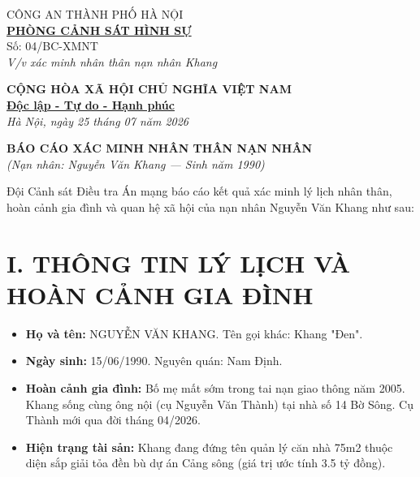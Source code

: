 \documentclass[12pt,a4paper]{article}
\begin{document}
\noindent
\begin{minipage}[t]{0.45\textwidth}
    \begin{center}
        \small
        CÔNG AN THÀNH PHỐ HÀ NỘI\\
        \textbf{\underline{PHÒNG CẢNH SÁT HÌNH SỰ}}\\[0.1cm]
        Số: 04/BC-XMNT\\
        \textit{V/v xác minh nhân thân nạn nhân Khang}
    \end{center}
\end{minipage}
\hfill
\begin{minipage}[t]{0.52\textwidth}
    \begin{center}
        \small
        \textbf{CỘNG HÒA XÃ HỘI CHỦ NGHĨA VIỆT NAM}\\
        \textbf{\underline{Độc lập - Tự do - Hạnh phúc}}\\[0.1cm]
        \textit{Hà Nội, ngày 25 tháng 07 năm 2026}
    \end{center}
\end{minipage}

\vspace{0.6cm}

\begin{center}
    \textbf{\large BÁO CÁO XÁC MINH NHÂN THÂN NẠN NHÂN}\\
    \textit{(Nạn nhân: Nguyễn Văn Khang — Sinh năm 1990)}
\end{center}

\vspace{0.3cm}

\noindent Đội Cảnh sát Điều tra Án mạng báo cáo kết quả xác minh lý lịch nhân thân, hoàn cảnh gia đình và quan hệ xã hội của nạn nhân Nguyễn Văn Khang như sau:

\section*{I. THÔNG TIN LÝ LỊCH VÀ HOÀN CẢNH GIA ĐÌNH}
\begin{itemize}[leftmargin=1.5cm]
    \item \textbf{Họ và tên:} NGUYỄN VĂN KHANG. Tên gọi khác: Khang "Đen".
    \item \textbf{Ngày sinh:} 15/06/1990. Nguyên quán: Nam Định.
    \item \textbf{Hoàn cảnh gia đình:} Bố mẹ mất sớm trong tai nạn giao thông năm 2005. Khang sống cùng ông nội (cụ Nguyễn Văn Thành) tại nhà số 14 Bờ Sông. Cụ Thành mới qua đời tháng 04/2026.
    \item \textbf{Hiện trạng tài sản:} Khang đang đứng tên quản lý căn nhà 75m2 thuộc diện sắp giải tỏa đền bù dự án Cảng sông (giá trị ước tính 3.5 tỷ đồng).
\end{itemize}
\end{document}
